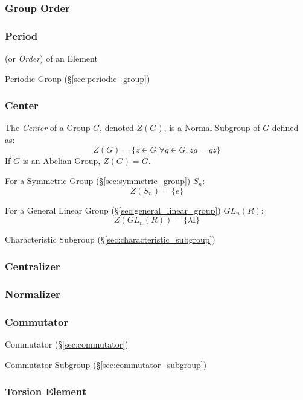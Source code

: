 \subsubsection{Group Order}\label{sec:group_order}

\subsubsection{Period}\label{sec:period}

(or \emph{Order}) of an Element

Periodic Group (\S\ref{sec:periodic_group})



\subsubsection{Center}\label{sec:group_center}

The \emph{Center} of a Group $G$, denoted $Z(G)$, is a Normal Subgroup of $G$
defined as:
\[
    Z(G) = \{ z \in G | \forall g \in G, zg = gz \}
\]
If $G$ is an Abelian Group, $Z(G) = G$.

For a Symmetric Group (\S\ref{sec:symmetric_group}) $S_n$:
\[
    Z(S_n) = \{e\}
\]

For a General Linear Group (\S\ref{sec:general_linear_group}) $GL_n(R)$:
\[
    Z(GL_n(R)) = \{\lambda \mathrm{I}\}
\]

Characteristic Subgroup (\S\ref{sec:characteristic_subgroup})



\subsubsection{Centralizer}\label{sec:group_centralizer}

\subsubsection{Normalizer}\label{sec:group_normalizer}

\subsubsection{Commutator}\label{sec:group_commutator}

Commutator (\S\ref{sec:commutator})

Commutator Subgroup (\S\ref{sec:commutator_subgroup})



\subsubsection{Torsion Element}\label{sec:torsion_element}

